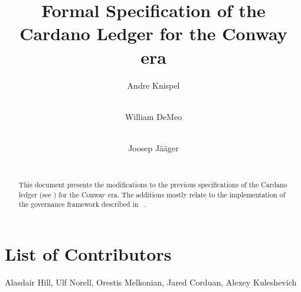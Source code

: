 \documentclass[11pt,a4paper,dvipsnames]{article}
\begin{document}
\title{Formal Specification of the Cardano Ledger for the Conway era}

\author{
   Andre Knispel \\ {\small {}} \\
   \and
   William DeMeo \\ {\small {}} \\
   \and
   Joosep Jääger \\ {\small {}} \\
   }

\date{}

\maketitle

\begin{abstract}
  This document presents the modifications to the previous
  specifications of the Cardano ledger (see
  \cite{shelley-ledger-spec,shelley-ma-ledger-spec,alonzo-ledger-spec,babbage-ledger-spec})
  for the Conway era.  The additions mostly relate to the implementation of the governance
  framework described in ~\parencite{cip1694}.
\end{abstract}

\section*{List of Contributors}
\label{acknowledgements}

Alasdair Hill, Ulf Norell, Orestis Melkonian, Jared Corduan, Alexey Kuleshevich

\tableofcontents

\clearpage

















\clearpage

\printbibliography

\clearpage

\appendix




\end{document}
